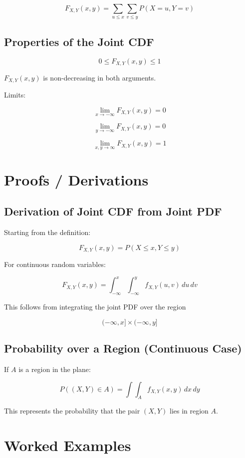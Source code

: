 \documentclass[12pt]{article}
\begin{document}
\[
F_{X,Y}(x,y) =
\sum_{u \le x}\sum_{v \le y}
P(X = u, Y = v)
\]

\subsection{Properties of the Joint CDF}

\[
0 \le F_{X,Y}(x,y) \le 1
\]

$F_{X,Y}(x,y)$ is non-decreasing in both arguments.

Limits:

\[
\lim_{x \to -\infty} F_{X,Y}(x,y) = 0
\]

\[
\lim_{y \to -\infty} F_{X,Y}(x,y) = 0
\]

\[
\lim_{x,y \to \infty} F_{X,Y}(x,y) = 1
\]

\section{Proofs / Derivations}

\subsection{Derivation of Joint CDF from Joint PDF}

Starting from the definition:

\[
F_{X,Y}(x,y) = P(X \le x, Y \le y)
\]

For continuous random variables:

\[
F_{X,Y}(x,y) =
\int_{-\infty}^{x}\int_{-\infty}^{y}
f_{X,Y}(u,v)\, du\, dv
\]

This follows from integrating the joint PDF over the region

\[
(-\infty, x] \times (-\infty, y]
\]

\subsection{Probability over a Region (Continuous Case)}

If $A$ is a region in the plane:

\[
P((X,Y) \in A) =
\int\int_A f_{X,Y}(x,y)\, dx\, dy
\]

This represents the probability that the pair $(X,Y)$ lies in region $A$.

\section{Worked Examples}
\end{document}
